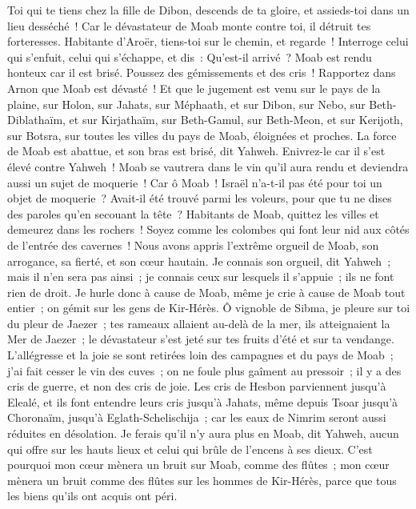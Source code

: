 \begin{multicols}{2}
Toi qui te tiens chez la fille de Dibon, descends de ta gloire, et assieds-toi dans un lieu desséché~! Car le dévastateur de Moab monte contre toi, il détruit tes forteresses.
Habitante d'Aroër, tiens-toi sur le chemin, et regarde~! Interroge celui qui s'enfuit, celui qui s'échappe, et dis~: Qu'est-il arrivé~?
Moab est rendu honteux car il est brisé. Poussez des gémissements et des cris~! Rapportez dans Arnon que Moab est dévasté~!
Et que le jugement est venu sur le pays de la plaine, sur Holon, sur Jahats, sur Méphaath,
et sur Dibon, sur Nebo, sur Beth-Diblathaïm,
et sur Kirjathaïm, sur Beth-Gamul, sur Beth-Meon,
et sur Kerijoth, sur Botsra, sur toutes les villes du pays de Moab, éloignées et proches.
La force de Moab est abattue, et son bras est brisé, dit Yahweh.
Enivrez-le car il s'est élevé contre Yahweh~! Moab se vautrera dans le vin qu'il aura rendu et deviendra aussi un sujet de moquerie~!
Car ô Moab~! Israël n'a-t-il pas été pour toi un objet de moquerie~? Avait-il été trouvé parmi les voleurs, pour que tu ne dises des paroles qu'en secouant la tête~?
Habitants de Moab, quittez les villes et demeurez dans les rochers~! Soyez comme les colombes qui font leur nid aux côtés de l'entrée des cavernes~!
Nous avons appris l'extrême orgueil de Moab, son arrogance, sa fierté, et son cœur hautain.
Je connais son orgueil, dit Yahweh~; mais il n'en sera pas ainsi~; je connais ceux sur lesquels il s'appuie~; ils ne font rien de droit.
Je hurle donc à cause de Moab, même je crie à cause de Moab tout entier~; on gémit sur les gens de Kir-Hérès.
Ô vignoble de Sibma, je pleure sur toi du pleur de Jaezer~; tes rameaux allaient au-delà de la mer, ils atteignaient la Mer de Jaezer~; le dévastateur s'est jeté sur tes fruits d'été et sur ta vendange.
L'allégresse et la joie se sont retirées loin des campagnes et du pays de Moab~; j'ai fait cesser le vin des cuves~; on ne foule plus gaîment au pressoir~; il y a des cris de guerre, et non des cris de joie.
Les cris de Hesbon parviennent jusqu'à Elealé, et ils font entendre leurs cris jusqu'à Jahats, même depuis Tsoar jusqu'à Choronaïm, jusqu'à Eglath-Schelischija~; car les eaux de Nimrim seront aussi réduites en désolation.
Je ferais qu'il n'y aura plus en Moab, dit Yahweh, aucun qui offre sur les hauts lieux et celui qui brûle de l'encens à ses dieux.
C'est pourquoi mon cœur mènera un bruit sur Moab, comme des flûtes~; mon cœur mènera un bruit comme des flûtes sur les hommes de Kir-Hérès, parce que tous les biens qu'ils ont acquis ont péri.

\end{multicols}

